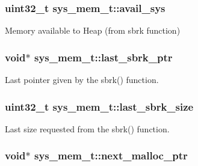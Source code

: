 \subsubsection[{\texorpdfstring{avail\+\_\+sys}{avail_sys}}]{\setlength{\rightskip}{0pt plus 5cm}uint32\+\_\+t sys\+\_\+mem\+\_\+t\+::avail\+\_\+sys}\hypertarget{structsys__mem__t_a8ecba5ffd106ad27d5c8792c2eeb8e1b}{}\label{structsys__mem__t_a8ecba5ffd106ad27d5c8792c2eeb8e1b}


Memory available to Heap (from sbrk function) 

\subsubsection[{\texorpdfstring{last\+\_\+sbrk\+\_\+ptr}{last_sbrk_ptr}}]{\setlength{\rightskip}{0pt plus 5cm}void$\ast$ sys\+\_\+mem\+\_\+t\+::last\+\_\+sbrk\+\_\+ptr}\hypertarget{structsys__mem__t_ac8a8ed2fb96fae8f0e7961a5c234b3a0}{}\label{structsys__mem__t_ac8a8ed2fb96fae8f0e7961a5c234b3a0}


Last pointer given by the sbrk() function. 

\subsubsection[{\texorpdfstring{last\+\_\+sbrk\+\_\+size}{last_sbrk_size}}]{\setlength{\rightskip}{0pt plus 5cm}uint32\+\_\+t sys\+\_\+mem\+\_\+t\+::last\+\_\+sbrk\+\_\+size}\hypertarget{structsys__mem__t_aede69012147cf9fb23a2133a60d3b464}{}\label{structsys__mem__t_aede69012147cf9fb23a2133a60d3b464}


Last size requested from the sbrk() function. 

\subsubsection[{\texorpdfstring{next\+\_\+malloc\+\_\+ptr}{next_malloc_ptr}}]{\setlength{\rightskip}{0pt plus 5cm}void$\ast$ sys\+\_\+mem\+\_\+t\+::next\+\_\+malloc\+\_\+ptr}\hypertarget{structsys__mem__t_a3178ccefa2e90fa6723f77ff95b94d2a}{}\label{structsys__mem__t_a3178ccefa2e90fa6723f77ff95b94d2a}


